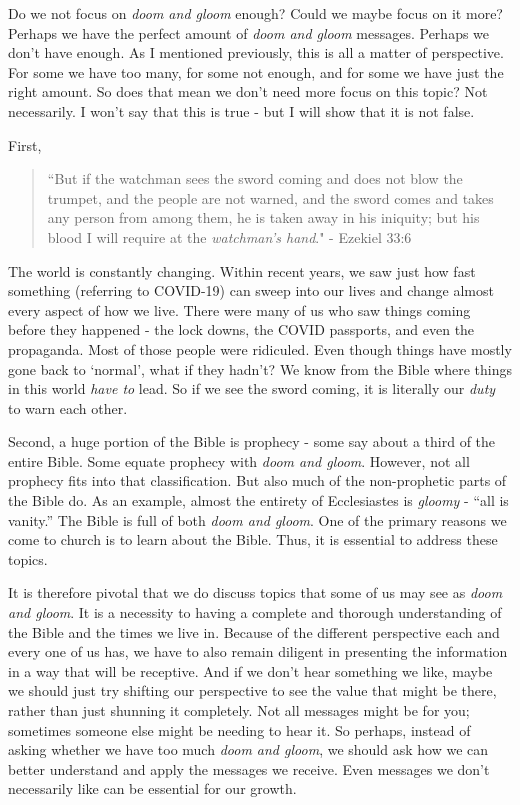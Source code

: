 \documentclass[10pt]{article}
\begin{document}
\begin{multicols}{2}
Do we not focus on \textit{doom and gloom} enough? Could we maybe focus on it more? Perhaps we have the perfect amount of \textit{doom and gloom} messages. Perhaps we don't have enough. As I mentioned previously, this is all a matter of perspective. For some we have too many, for some not enough, and for some we have just the right amount. So does that mean we don’t need more focus on this topic? Not necessarily. I won't say that this is true - but I will show that it is not false.

First,

\begin{quotation}
	``But if the watchman sees the sword coming and does not blow the trumpet, and the people are not warned, and the sword comes and takes any person from among them, he is taken away in his iniquity; but his blood I will require at the \textit{watchman’s hand}." - Ezekiel 33:6
\end{quotation}

The world is constantly changing. Within recent years, we saw just how fast something (referring to COVID-19) can sweep into our lives and change almost every aspect of how we live. There were many of us who saw things coming before they happened - the lock downs, the COVID passports, and even the propaganda. Most of those people were ridiculed. Even though things have mostly gone back to `normal', what if they hadn't? We know from the Bible where things in this world \textit{have to} lead. So if we see the sword coming, it is literally our \textit{duty} to warn each other.

Second, a huge portion of the Bible is prophecy - some say about a third of the entire Bible. Some equate prophecy with \textit{doom and gloom}. However, not all prophecy fits into that classification. But also much of the non-prophetic parts of the Bible do. As an example, almost the entirety of Ecclesiastes is \textit{gloomy} - ``all is vanity.'' The Bible is full of both \textit{doom and gloom}. One of the primary reasons we come to church is to learn about the Bible. Thus, it is essential to address these topics.

It is therefore pivotal that we do discuss topics that some of us may see as \textit{doom and gloom}. It is a necessity to having a complete and thorough understanding of the Bible and the times we live in. Because of the different perspective each and every one of us has, we have to also remain diligent in presenting the information in a way that will be receptive. And if we don't hear something we like, maybe we should just try shifting our perspective to see the value that might be there, rather than just shunning it completely. Not all messages might be for you; sometimes someone else might be needing to hear it. So perhaps, instead of asking whether we have too much \textit{doom and gloom}, we should ask how we can better understand and apply the messages we receive. Even messages we don't necessarily like can be essential for our growth.


\end{multicols}
\end{document}
